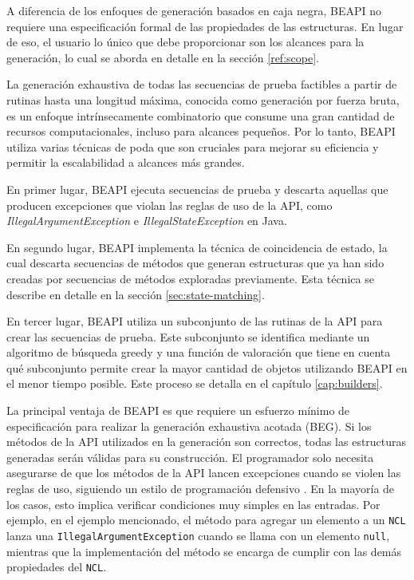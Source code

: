 A diferencia de los enfoques de generación basados en caja negra, \textsf{BEAPI} no requiere una especificación formal de las propiedades de las estructuras. En lugar de eso, el usuario lo único que debe proporcionar son los alcances para la generación, lo cual se aborda en detalle en la sección \ref{ref:scope}.

La generación exhaustiva de todas las secuencias de prueba factibles a partir de rutinas hasta una longitud máxima, conocida como generación por fuerza bruta, es un enfoque intrínsecamente combinatorio que consume una gran cantidad de recursos computacionales, incluso para alcances pequeños. Por lo tanto, \textsf{BEAPI} utiliza varias técnicas de poda que son cruciales para mejorar su eficiencia y permitir la escalabilidad a alcances más grandes.

En primer lugar, \textsf{BEAPI} ejecuta secuencias de prueba y descarta aquellas que producen excepciones que violan las reglas de uso de la API, como \emph{IllegalArgumentException} e \emph{IllegalStateException} en Java.

En segundo lugar, \textsf{BEAPI} implementa la técnica de coincidencia de estado, la cual descarta secuencias de métodos que generan estructuras que ya han sido creadas por secuencias de métodos exploradas previamente. Esta técnica se describe en detalle en la sección \ref{sec:state-matching}.

En tercer lugar, \textsf{BEAPI} utiliza un subconjunto de las rutinas de la API para crear las secuencias de prueba. Este subconjunto se identifica mediante un algoritmo de búsqueda greedy y una función de valoración que tiene en cuenta qué subconjunto permite crear la mayor cantidad de objetos utilizando \textsf{BEAPI} en el menor tiempo posible. Este proceso se detalla en el capítulo \ref{cap:builders}.

La principal ventaja de \textsf{BEAPI} es que requiere un esfuerzo mínimo de especificación para realizar la generación exhaustiva acotada (BEG). Si los métodos de la API utilizados en la generación son correctos, todas las estructuras generadas serán válidas para su construcción. El programador solo necesita asegurarse de que los métodos de la API lancen excepciones cuando se violen las reglas de uso, siguiendo un estilo de programación defensivo \cite{Liskov00}. En la mayoría de los casos, esto implica verificar condiciones muy simples en las entradas. Por ejemplo, en el ejemplo mencionado, el método para agregar un elemento a un \texttt{NCL} lanza una \texttt{IllegalArgumentException} cuando se llama con un elemento \texttt{null}, mientras que la implementación del método se encarga de cumplir con las demás propiedades del \texttt{NCL}.

